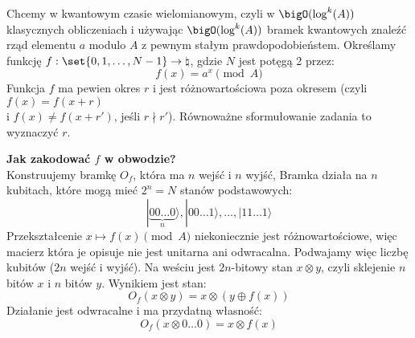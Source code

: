 Chcemy w kwantowym czasie wielomianowym, czyli w \( \bigO(\log^k(A)) \) klasycznych obliczeniach i używając \( \bigO(\log^k(A)) \) bramek kwantowych znaleźć rząd elementu \( a \) modulo \( A \) z pewnym stałym prawdopodobieństem.
Określamy funkcję \( f : \set{0, 1, \ldots, N - 1} \to \natural \), gdzie \( N \) jest potęgą 2 przez:
\[
    f(x) = a^x \pmod{A}
\]
Funkcja \( f \) ma pewien okres \( r \) i jest różnowartościowa poza okresem (czyli \( f(x) = f(x + r) \) \\ i \( f(x) \neq f(x + r') \), jeśli \( r \nmid r' \)).
Równoważne sformułowanie zadania to wyznaczyć \( r \).

\textbf{Jak zakodować \( f \) w obwodzie?} \\
Konstruujemy bramkę \( O_f \), która ma \( n \) wejść i \( n \) wyjść, Bramka działa na \( n \) kubitach, które mogą mieć \( 2^n = N \) stanów podstawowych:
\[
    |\underbrace{00\ldots0}_n\rangle, |00\ldots1\rangle, \ldots, |11\ldots1\rangle
\]
Przekształcenie \( x \mapsto f(x) \pmod{A} \) niekoniecznie jest różnowartościowe, więc macierz która je opisuje nie jest unitarna ani odwracalna.
Podwajamy więc liczbę kubitów (\( 2n \) wejść i wyjść). Na weściu jest \( 2n \)-bitowy stan \( x \otimes y \), czyli sklejenie \( n \) bitów \( x \) i \( n \) bitów \( y \).
Wynikiem jest stan:
\[
    O_f(x \otimes y) = x \otimes (y \oplus f(x))
\]
Działanie jest odwracalne i ma przydatną własność:
\[
    O_f(x \otimes 0\ldots0) = x \otimes f(x)
\]

